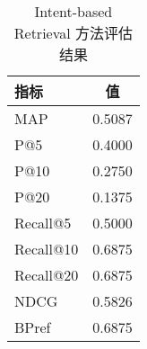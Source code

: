 \begin{table}[h]
\centering
\caption{Intent-based Retrieval 方法评估结果}
\begin{tabular}{|l|c|}
\hline
指标 & 值 \\
\hline
MAP & 0.5087 \\
P@5 & 0.4000 \\
P@10 & 0.2750 \\
P@20 & 0.1375 \\
Recall@5 & 0.5000 \\
Recall@10 & 0.6875 \\
Recall@20 & 0.6875 \\
NDCG & 0.5826 \\
BPref & 0.6875 \\
\hline
\end{tabular}
\end{table}
